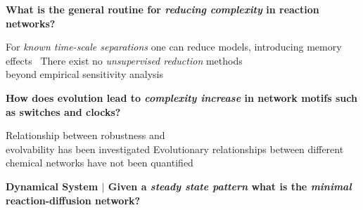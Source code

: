 \documentclass[a0,portrait]{a0poster}
\begin{document}
\begin{multicols}{2}

\begin{tcolorbox}[boxrule=2pt,arc=3.4pt,boxsep=2mm]
	\begin{center}
		\textbf{
		What is the general routine for \textit{reducing complexity} in reaction networks?}
	\end{center}
\end{tcolorbox}

\begin{itemize}[leftmargin=3cm]
	\up For \textit{known time-scale separations} one can reduce models, introducing memory effects~\cite{Phillies2000ProjectionFormalism}
	\down There exist no \textit{unsupervised reduction} methods\\beyond
	empirical sensitivity analysis
\end{itemize}

\vfill
\columnbreak

\begin{tcolorbox}[boxrule=2pt,arc=3.4pt,boxsep=2mm]
	\begin{center}
		\textbf{
		How does evolution lead to \textit{complexity increase} in network motifs such as switches and clocks?}
	\end{center}
\end{tcolorbox}

\begin{itemize}[leftmargin=3cm]
	\up Relationship between robustness and \\evolvability has been investigated \cite{Daniels2008SloppinessBiology}
	\down Evolutionary relationships between different chemical networks have not been quantified
\end{itemize}

\vfill
\end{multicols}
\vspace{1cm}

\begin{tcolorbox}[boxrule=2pt,arc=3.4pt,boxsep=2mm]
	\begin{center}
		\textbf{\color{Grey}Dynamical System \color{Black}$|$
		Given a \textit{steady state pattern} what is the \textit{minimal} reaction-diffusion network?}
	\end{center}
\end{tcolorbox}
\end{document}
